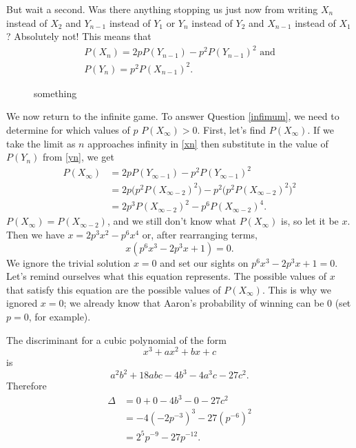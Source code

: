 \documentclass{book}
\begin{document}
But wait a second. Was there anything stopping us just now from writing $X_n$ instead of $X_2$ and $Y_{n-1}$ instead of $Y_1$ or $Y_n$ instead of $Y_2$ and $X_{n-1}$ instead of $X_1$? Absolutely not! This means that
\begin{gather}
P(X_n) = 2pP(Y_{n-1}) - p^2P(Y_{n-1})^2\text{ and}\label{xn}\\
P(Y_n) = p^2P(X_{n-1})^2.\label{yn}
\end{gather}

\begin{figure}[ht]
\centering
{}
\caption{something}
\end{figure}

We now return to the infinite game. To answer Question \ref{infimum}, we need to determine for which values of $p$ $P(X_\infty) > 0$. First, let's find $P(X_\infty)$. If we take the limit as $n$ approaches infinity in \eqref{xn} then substitute in the value of $P(Y_n)$ from \eqref{yn}, we get
\begin{align*}
P(X_\infty) &= 2pP(Y_{\infty-1}) - p^2P(Y_{\infty-1})^2\\
&= 2p\Big(p^2P(X_{\infty-2})^2\Big) - p^2\Big(p^2P(X_{\infty-2})^2\Big)^2\\
&= 2p^3P(X_{\infty-2})^2 - p^6P(X_{\infty-2})^4.
\end{align*}
$P(X_\infty) = P(X_{\infty-2})$, and we still don't know what $P(X_\infty)$ is, so let it be $x$. Then we have $x = 2p^3x^2 - p^6x^4$ or, after rearranging terms,
\begin{equation*}
x(p^6x^3 - 2p^3x + 1) = 0.
\end{equation*}
We ignore the trivial solution $x = 0$ and set our sights on $p^6x^3 - 2p^3x + 1 = 0$. Let's remind ourselves what this equation represents. The possible values of $x$ that satisfy this equation are the possible values of $P(X_\infty)$. This is why we ignored $x=0$; we already know that Aaron's probability of winning can be $0$ (set $p = 0$, for example). 

The discriminant for a cubic polynomial of the form \[x^3 + ax^2 + bx + c\] is \[a^2b^2 + 18abc - 4b^3 - 4a^3c - 27c^2.\] Therefore
\begin{align*}
\Delta &= 0 + 0 -4b^3 - 0 - 27c^2\\
&=-4(-2p^{-3})^3 - 27(p^{-6})^2\\
&=2^5p^{-9} - 27p^{-12}.
\end{align*}
\end{document}
